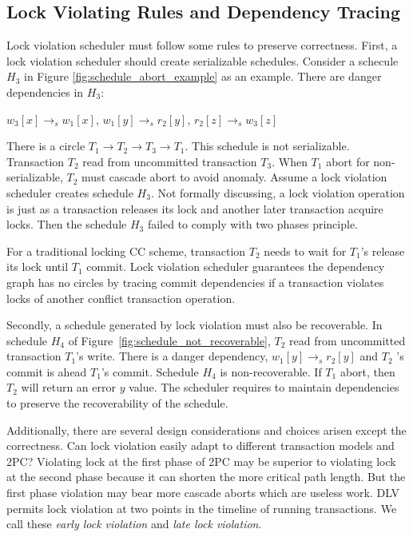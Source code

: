 \documentclass[conference]{IEEEtran}
\begin{document}
\subsection{Lock Violating Rules and Dependency Tracing}

Lock violation scheduler must follow some rules to preserve correctness.
First, a lock violation scheduler should create serializable schedules.
Consider a schecule ${H_3}$ in Figure \ref{fig:schedule_abort_example} as an example.
There are danger dependencies in ${H_3}$:

\begin{center}
  ${w_3[x] \rightarrow _s w_1[x]}$, 
${w_1[y] \rightarrow _s r_2[y]}$,
${r_2[z] \rightarrow _s w_3[z]}$
\end{center}

There is a circle ${T_1 \rightarrow T_2 \rightarrow T_3 \rightarrow T_1}$.
This schedule is not serializable.
Transaction ${T_2}$
read from uncommitted transaction ${T_3}$.
When ${T_1}$ abort for non-serializable, ${T_2}$ must cascade abort to avoid anomaly.
Assume a lock violation scheduler creates schedule ${H_3}$.
Not formally discussing, a lock violation operation is just as a transaction releases its lock and another later transaction acquire locks.
Then the schedule ${H_3}$ failed to comply with two phases principle.

For a traditional locking CC scheme, transaction ${T_2}$ needs to wait for ${T_1}$'s release its lock until ${T_1}$ commit.
Lock violation scheduler guarantees the dependency graph has no circles by tracing commit dependencies if a transaction violates locks of another conflict transaction operation. 

Secondly, a schedule generated by lock violation must also be recoverable.
In schedule ${H_4}$ of Figure~\ref{fig:schedule_not_recoverable}, 
${T_2}$ read from uncommitted transaction ${T_1}$'s write.
There is a danger dependency, ${w_1[y] \rightarrow_s r_2[y]}$ and ${T_2}$ 's commit is ahead ${T_1}$'s commit.
Schedule ${H_4}$ is non-recoverable.
If ${T_1}$ abort, then ${T_2}$ will return an error ${y}$ value.
The scheduler requires to maintain dependencies to preserve the recoverability of the schedule. 


Additionally, there are several design considerations and choices arisen except the correctness.
Can lock violation easily adapt to different transaction models and 2PC?
Violating lock at the first phase of 2PC may be superior to violating lock at the second phase because it can shorten the more critical path length.
But the first phase violation may bear more cascade aborts which are useless work.
DLV permits lock violation at two points in the timeline of running transactions.
We call these \emph{early lock violation} and \emph{late lock violation}.
\end{document}
